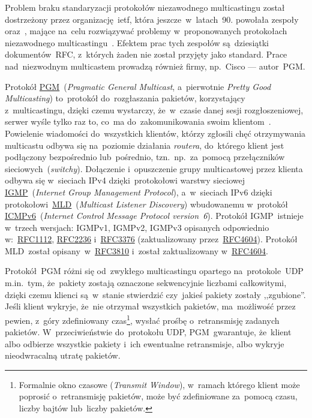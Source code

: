 \documentclass[thesis]{subfiles}
\begin{document}
Problem braku standaryzacji protokołów niezawodnego multicastingu został dostrzeżony przez organizację~\gls{ietf}, która jeszcze~w~latach~90. powołała zespoły  oraz~, mające na~celu rozwiązywać problemy w~proponowanych protokołach niezawodnego multicastingu~\cite{reliable-multicast-journal,reliable-multicast-transport}. Efektem prac tych zespołów są~dziesiątki dokumentów~RFC, z~których żaden nie został przyjęty jako standard. Prace nad~niezwodnym multicastem prowadzą również firmy, np.~Cisco --- autor~PGM.

Protokół \href{https://tools.ietf.org/html/rfc3208}{PGM}~(\emph{Pragmatic General Multicast}, a~pierwotnie \emph{Pretty Good Multicasting}) to~protokół do~rozgłaszania pakietów, korzystający z~multicastingu, dzięki czemu wystarczy, że~w~czasie danej sesji rozgłoszeniowej, serwer wyśle tylko raz to, co~ma do~zakomunikowania swoim klientom~\cite{pgm-rfc}. Powielenie wiadomości do~wszystkich klientów, którzy zgłosili chęć otrzymywania multicastu odbywa się na~poziomie działania \emph{routera}, do~którego klient jest podłączony bezpośrednio lub~pośrednio, tzn.~np.~za~pomocą przełączników sieciowych~(\emph{switchy}). Dołączenie i~opuszczenie grupy multicastowej przez klienta odbywa się w~sieciach IPv4 dzięki~protokołowi warstwy sieciowej \href{https://en.wikipedia.org/wiki/Internet_Group_Management_Protocol}{IGMP}~(\emph{Internet Group Management Protocol}), a~w~sieciach IPv6 dzięki protokołowi~\href{https://en.wikipedia.org/wiki/Multicast_Listener_Discovery}{MLD}~(\emph{Multicast Listener Discovery}) wbudowanemu w~protokół \href{https://en.wikipedia.org/wiki/Internet_Control_Message_Protocol_version_6}{ICMPv6}~(\emph{Internet Control Message Protocol version~6}). Protokół IGMP~istnieje w~trzech wersjach: IGMPv1, IGMPv2, IGMPv3 opisanych odpowiednio w:~\href{https://tools.ietf.org/html/rfc1112}{RFC1112}, \href{https://tools.ietf.org/html/rfc2236}{RFC2236} i~\href{https://tools.ietf.org/html/rfc3376}{RFC3376} (zaktualizowany przez~\href{https://tools.ietf.org/html/rfc4604}{RFC4604}). Protokół MLD~został opisany~w~\href{https://tools.ietf.org/html/rfc3810}{RFC3810} i~został zaktualizowany w~\href{https://tools.ietf.org/html/rfc4604}{RFC4604}.

Protokół~PGM różni się od~zwykłego multicastingu opartego na~protokole~UDP m.in.~tym, że~pakiety zostają oznaczone sekwencyjnie liczbami całkowitymi, dzięki czemu klienci są~w~stanie stwierdzić czy~jakieś pakiety zostały ,,zgubione''. Jeśli klient wykryje, że~nie otrzymał wszystkich pakietów, ma~możliwość przez pewien, z~góry zdefiniowany czas\footnote{Formalnie okno czasowe (\emph{Transmit Window}), w~ramach którego klient może poprosić o~retransmisję pakietów, może być zdefiniowane za~pomocą czasu, liczby bajtów lub~liczby pakietów.}, wysłać prośbę o~retransmisję zadanych pakietów. W~przeciwieństwie do~protokołu UDP, PGM~gwarantuje, że~klient albo odbierze wszystkie pakiety i~ich ewentualne retransmisje, albo wykryje nieodwracalną utratę pakietów.
\end{document}
